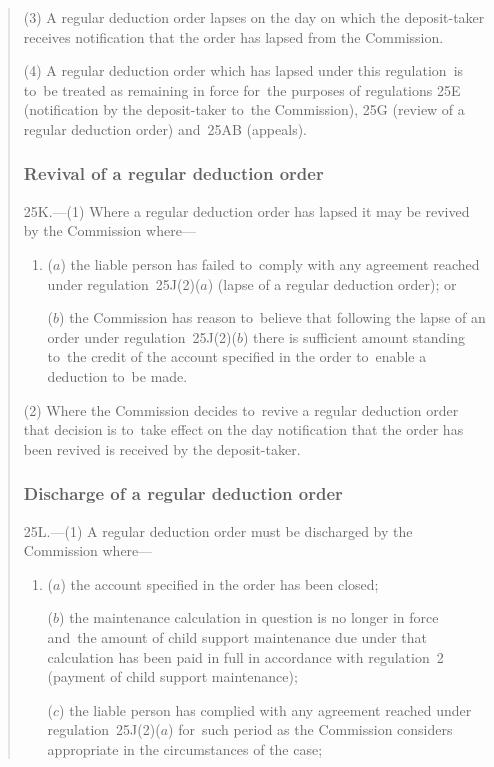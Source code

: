 \documentclass[12pt,a4paper]{article}
\begin{document}
\begin{quotation}
(3) A regular deduction order lapses on the day on which the deposit-taker receives notification that the order has lapsed from the Commission.

(4) A regular deduction order which has lapsed under this regulation~is to~be treated as remaining in force for~the purposes of regulations 25E (notification by the deposit-taker to~the Commission), 25G (review of a regular deduction order) and~25AB (appeals).

\subsubsection*{Revival of a regular deduction order}

25K.---(1)  Where a regular deduction order has lapsed it may be revived by the Commission where—
\begin{enumerate}\item[]
($a$) the liable person has failed to~comply with any agreement reached under regulation~25J(2)($a$)  (lapse of a regular deduction order); or

($b$) the Commission has reason to~believe that following the lapse of an order under regulation~25J(2)($b$)  there is sufficient amount standing to~the credit of the account specified in the order to~enable a deduction to~be made.
\end{enumerate}

(2) Where the Commission decides to~revive a regular deduction order that decision is to~take effect on the day notification that the order has been revived is received by the deposit-taker.

\subsubsection*{Discharge of a regular deduction order}

25L.---(1)  A regular deduction order must be discharged by the Commission where—
\begin{enumerate}\item[]
($a$) the account specified in the order has been closed;

($b$) the maintenance calculation in question is no longer in force and~the amount of child support maintenance due under that calculation has been paid in full in accordance with regulation~2 (payment of child support maintenance);

($c$) the liable person has complied with any agreement reached under regulation~25J(2)($a$)  for~such period as the Commission considers appropriate in the circumstances of the case;


\end{enumerate}
\end{quotation}
\end{document}
